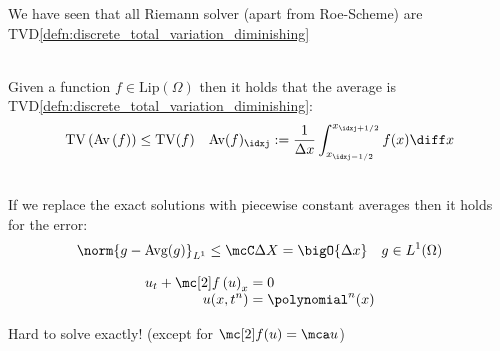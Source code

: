 \begin{corbox}\nospacing
    \begin{cor}\label{cor:evolution_is_tvd}
        We have seen that all Riemann solver (apart from Roe-Scheme) are TVD\cref{defn:discrete_total_variation_diminishing}
    \end{cor}
\end{corbox}
\begin{corbox}\nospacing
    \begin{cor}\label{cor:averaging_is_tvd}\leavevmode\\
        Given a function $f\in\text{Lip}(\Omega)$ then it holds that the average is TVD\cref{defn:discrete_total_variation_diminishing}:
        \begin{align}
          \text{TV}\left(\text{Av}\left(f\right)\right)\leq\text{TV}(f)&&
          \text{Av}(f)_{\idxj}:=\frac{1}{\Delta x}\int_{x_{\idxj-1/2}}^{x_{\idxj+1/2}}f(x)\diff x
        \end{align}
    \end{cor}
\end{corbox}
\begin{lemmabox}
    \begin{lemma}\label{piecewise_constant_averaging}\leavevmode\\
        If we replace the exact solutions with piecewise constant averages then it holds for the error:
        \begin{align}
          \norm{g-\text{Avg}(g)}_{L^{1}}\leq \mcC\Delta X=\bigO{\Delta x}&&g\in L^{1}(\Omega)
        \end{align}
    \end{lemma}
\end{lemmabox}
\begin{defnbox}\nospacing
    \begin{defn}
        \label{defn:generalized_riemann_problem}
            \begin{align}
            u_{t}+\flux \left(u\right)_{x}&=0 \\[-1\jot]
            u(x,t^{n})&=\polynomial^{n}(x)            \label{eq:generalized_riemann_problem}
            \end{align}
    \end{defn}
\end{defnbox}
\begin{sectionbox}\nospacing
   \begin{conslist}
       \item Hard to solve exactly! (except for $\flux(u)=\mca u$)
   \end{conslist}
\end{sectionbox}



